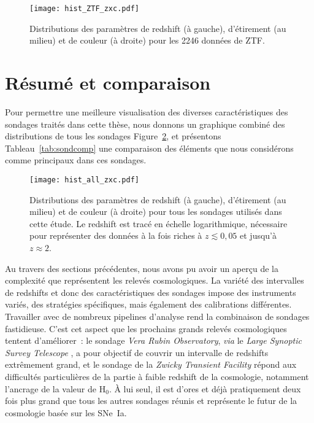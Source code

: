 \documentclass[../main/main.tex]{subfiles}
\begin{document}
\begin{figure}[]
    \centering
    \texttt{[image: hist\_ZTF\_zxc.pdf]}
    \caption[Distributions des paramètres de redshift, étirement et couleur de
    ZTF]{Distributions des paramètres de redshift (à gauche), d'étirement (au
    milieu) et de couleur (à droite) pour les 2246 données de ZTF.}
    \label{fig:ztfhist}
\end{figure}

\section{Résumé et comparaison}\label{sec:sondcomp}

Pour permettre une meilleure visualisation des diverses caractéristiques des
sondages traités dans cette thèse, nous donnons un graphique combiné des
distributions de tous les sondages Figure~\ref{fig:hist_all_zxc}, et présentons
Tableau~\ref{tab:sondcomp} une comparaison des éléments que nous considérons
comme principaux dans ces sondages.

\begin{figure}[ht!]
    \centering
    \texttt{[image: hist\_all\_zxc.pdf]}
    \caption[Distributions des paramètres de redshift, étirement et couleur de
    tous les sondages utilisés dans cette étude]{Distributions des paramètres de
        redshift (à gauche), d'étirement (au milieu) et de couleur (à droite)
        pour tous les sondages utilisés dans cette étude. Le redshift est tracé
        en échelle logarithmique, nécessaire pour représenter des données à la
        fois riches à $z \lesssim 0,05$ et jusqu'à $z \approx 2$.}
    \label{fig:hist_all_zxc}
\end{figure}

Au travers des sections précédentes, nous avons pu avoir un aperçu de la
complexité que représentent les relevés cosmologiques. La variété des
intervalles de redshifts et donc des caractéristiques des sondages impose des
instruments variés, des stratégies spécifiques, mais également des calibrations
différentes. Travailler avec de nombreux pipelines d'analyse rend la combinaison
de sondages fastidieuse. C'est cet aspect que les prochains grands relevés
cosmologiques tentent d'améliorer~: le sondage \textit{Vera Rubin Observatory},
\textit{via} le \textit{Large Synoptic Survey Telescope}
\citep[LSST,][]{ivezic2019}, a pour objectif de couvrir un intervalle de
redshifts extrêmement grand, et le sondage de la \textit{Zwicky Transient
Facility} répond aux difficultés particulières de la partie à faible redshift de
la cosmologie, notamment l'ancrage de la valeur de H$_0$. À lui seul, il est
d'ores et déjà pratiquement deux fois plus grand que tous les autres sondages
réunis et représente le futur de la cosmologie basée sur les SNe~Ia.
\end{document}
